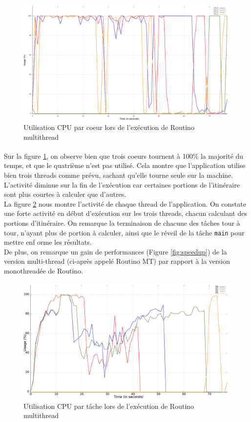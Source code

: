 \begin{figure}[H]
\centering
\includegraphics[scale=0.285]{include/cpu_usage.png}
\caption{Utilisation CPU par coeur lors de l'exécution de Routino multithread}
\label{fig:cpusage}
\end{figure}

\paragraph{}
Sur la figure \ref{fig:cpusage}, on observe bien que trois coeurs tournent à
100\% la majorité du temps, et que le quatrième n'est pas utilisé. Cela montre
que l'application utilise bien trois threads comme prévu, sachant qu'elle tourne
seule sur la machine. L'activité diminue sur la fin de l'exécution car certaines
portions de l'itinéraire sont plus courtes à calculer que d'autres.\\
La figure \ref{fig:threadusage} nous montre l'activité de chaque thread de
l'application. On constate une forte activité en début d'exécution sur les trois
threads, chacun calculant des portions d'itinéraire. On remarque la terminaison
de chacune des tâches tour à tour, n'ayant plus de portion à calculer, ainsi
que le réveil de la tâche \texttt{main} pour mettre enf orme les résultats.\\
De plus, on remarque un gain de performances (Figure \ref{fig:speedup}) de la 
version multi-thread (ci-après appelé Routino MT) par rapport à la version
monothreadée de Routino.

\begin{figure}[H]
\centering
\includegraphics[scale=0.27]{include/thread_usage.png}
\caption{Utilisation CPU par tâche lors de l'exécution de Routino multithread}
\label{fig:threadusage}
\end{figure}

